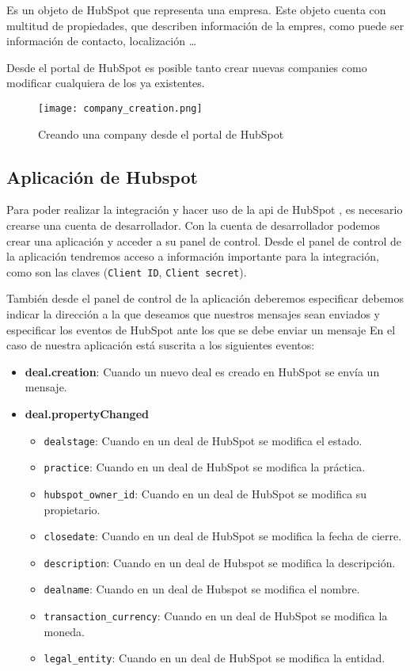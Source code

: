 		Es un objeto de HubSpot que representa una empresa. Este objeto cuenta con multitud de propiedades, que describen información de la empres, como puede ser información de contacto, localización \ldots 
		
		Desde el portal de HubSpot es posible tanto crear nuevas companies como modificar cualquiera de los ya existentes.
		
		\begin{figure}
			\centering
			\texttt{[image: company\_creation.png]}
			\caption{Creando una company desde el portal de HubSpot}
		\end{figure}


\subsection{Aplicación de Hubspot}
\label{subsec:app_hs}
Para poder realizar la integración y hacer uso de la \acrshort{api} de HubSpot \cite{hsapi}, es necesario crearse una cuenta de desarrollador. Con la cuenta de desarrollador podemos crear una aplicación y acceder a su panel de control. 
Desde el panel de control de la aplicación tendremos acceso a información importante para la integración, como son las claves (\verb|Client ID|, \verb|Client secret|).


También desde el panel de control de la aplicación deberemos especificar debemos indicar la dirección a la que deseamos que nuestros mensajes sean enviados y especificar los eventos de HubSpot ante los que se debe enviar un mensaje
En el caso de nuestra aplicación está suscrita a los siguientes eventos:

\begin{itemize}
	\item \textbf{deal.creation}: Cuando un nuevo deal es creado en HubSpot se envía un mensaje.
	\item \textbf{deal.propertyChanged} 
		\begin{itemize}
			\item \verb|dealstage|: Cuando en un deal de HubSpot se modifica el estado.
			\item \verb|practice|: Cuando en un deal de HubSpot se modifica la práctica.
			\item \verb|hubspot_owner_id|: Cuando en un deal de HubSpot se modifica su propietario.
			\item \verb|closedate|: Cuando en un deal de HubSpot se modifica la fecha de cierre.
			\item \verb|description|: Cuando en un deal de Hubspot se modifica la descripción.
			\item \verb|dealname|: Cuando en un deal de Hubspot se modifica el nombre.
			\item \verb|transaction_currency|: Cuando en un deal de HubSpot se modifica la moneda.
			\item \verb|legal_entity|: Cuando en un deal de HubSpot se modifica la entidad.
		\end{itemize}
\end{itemize}

